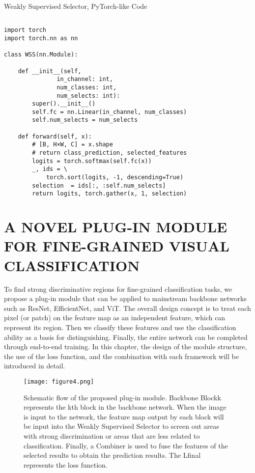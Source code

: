 \documentclass[conference]{IEEEtran}
\begin{document}
\begin{algorithm}[t]
\caption{Weakly Supervised Selector, PyTorch-like Code} 
\vspace{10pt}
\begin{verbatim}

import torch
import torch.nn as nn

class WSS(nn.Module):
  
    def __init__(self, 
               in_channel: int, 
               num_classes: int, 
               num_selects: int):
        super().__init__()
        self.fc = nn.Linear(in_channel, num_classes)
        self.num_selects = num_selects
    
    def forward(self, x):
        # [B, H×W, C] = x.shape
        # return class_prediction, selected_features
        logits = torch.softmax(self.fc(x))
        _, ids = \
            torch.sort(logits, -1, descending=True)
        selection  = ids[:, :self.num_selects]
        return logits, torch.gather(x, 1, selection)

\end{verbatim}
\vspace{10pt}
\end{algorithm}

\section{A NOVEL PLUG-IN  MODULE FOR FINE-GRAINED VISUAL CLASSIFICATION}

To find strong discriminative regions for fine-grained classification tasks, we propose a plug-in module that can be applied to mainstream backbone networks such as ResNet\cite{ResNet}, EfficientNet\cite{EfficientNet}, and ViT\cite{ViT}. The overall design concept is to treat each pixel (or patch) on the feature map as an independent feature, which can represent its region. Then we classify these features and use the classification ability as a basis for distinguishing. Finally, the entire network can be completed through end-to-end training. In this chapter, the design of the module structure, the use of the loss function, and the combination with each framework will be introduced in detail.

\begin{figure}[!tp]
    \centerline{\texttt{[image: figure4.png]}}
    \caption{Schematic flow of the proposed plug-in module. Backbone Blockk represents the kth block in the backbone network. When the image is input to the network, the feature map output by each block will be input into the Weakly Supervised Selector to screen out areas with strong discrimination or areas that are less related to classification. Finally, a Combiner is used to fuse the features of the selected results to obtain the prediction results. The Lfinal represents the loss function.}
    \label{fig4}
\end{figure}
\end{document}
